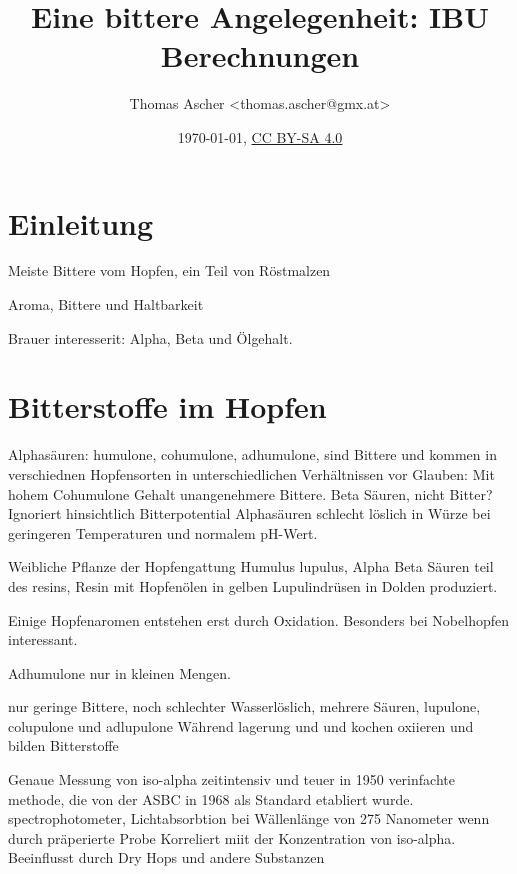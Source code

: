 \documentclass[a4paper,parskip=half]{scrartcl}
\title{Eine bittere Angelegenheit: IBU Berechnungen}
\author{Thomas Ascher <thomas.ascher@gmx.at>}
\date{\today, \href{http://creativecommons.org/licenses/by-sa/4.0/}{CC BY-SA 4.0}}
\begin{document}
\maketitle

\section*{Einleitung}

\parencite{Bastgen2020}

Meiste Bittere vom Hopfen, ein Teil von Röstmalzen \parencite[11]{Garetz1994}

\parencite[10]{Garetz1994}
Aroma, Bittere und Haltbarkeit

\parencite[103]{Garetz1994}
Brauer interesserit: Alpha, Beta und Ölgehalt.


\section*{Bitterstoffe im Hopfen}

\parencite[11]{Garetz1994}
Alphasäuren: humulone, cohumulone, adhumulone, sind Bittere und kommen in
verschiednen Hopfensorten in unterschiedlichen Verhältnissen vor
Glauben: Mit hohem Cohumulone Gehalt unangenehmere Bittere.
Beta Säuren, nicht Bitter? Ignoriert hinsichtlich Bitterpotential
Alphasäuren schlecht löslich in Würze bei geringeren Temperaturen
und normalem pH-Wert.

\parencite[20]{Garetz1994}
Weibliche Pflanze der Hopfengattung Humulus lupulus, Alpha Beta
Säuren teil des resins, Resin mit Hopfenölen in gelben
Lupulindrüsen in Dolden produziert.

\parencite[100]{Garetz1994} Einige Hopfenaromen entstehen erst
durch Oxidation. Besonders bei Nobelhopfen interessant.

\parencite[119]{Garetz1994} 
Adhumulone nur in kleinen Mengen.

\parencite[120]{Garetz1994} 
nur geringe Bittere, noch schlechter Wasserlöslich, mehrere Säuren,
lupulone, colupulone und adlupulone
Während lagerung und und kochen oxiieren und bilden Bitterstoffe

\parencite[60]{Beechum2017}
Genaue Messung von iso-alpha zeitintensiv und teuer
in 1950 verinfachte methode, die von der ASBC in 1968
als Standard etabliert wurde.
spectrophotometer, Lichtabsorbtion bei Wällenlänge
von 275 Nanometer wenn durch präperierte Probe
Korreliert miit der Konzentration von iso-alpha.
Beeinflusst durch Dry Hops und andere Substanzen
\end{document}
